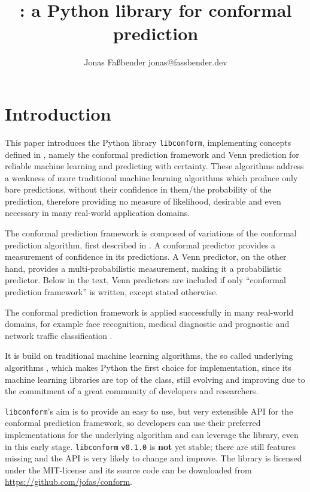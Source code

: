 \documentclass[twoside,11pt]{article}
\title{\libconform{} \version: a Python library for
       conformal prediction}
\author{\name Jonas Fa{\ss}bender
        \email jonas@fassbender.dev}
\def\version{\texttt{v0.1.0}}
\def\libconform{\texttt{libconform}}
\begin{document}
\maketitle




\section{Introduction}

This paper introduces the Python library \libconform,
implementing concepts defined in \citet{alrw}, namely the
conformal prediction framework and Venn prediction for
reliable machine learning and predicting with certainty.
These algorithms address a weakness of more traditional
machine learning algorithms which produce only bare
predictions, without their confidence in them/the
probability of the prediction, therefore providing no
measure of likelihood, desirable and even necessary in many
real-world application domains.

The conformal prediction framework is composed of
variations of the conformal prediction algorithm,
first described in
\citet{vovk_et_al_1999, saunders_et_al_1999}.
A conformal predictor provides a measurement of confidence
in its predictions.
A Venn predictor, on the other hand, provides a
multi-probabilistic measurement, making it a probabilistic
predictor.
Below in the text, Venn predictors are included if only
``conformal prediction framework'' is written, except
stated otherwise.

The conformal prediction framework is applied successfully
in many real-world domains, for example face recognition,
medical diagnostic and prognostic and network traffic
classification \citep[see][Part 3]{cprml}.

It is build on traditional machine learning algorithms, the
so called underlying algorithms
\citep[see][]{papadopoulos_et_al_2007}, which makes Python
the first choice for implementation, since its machine
learning libraries are top of the class, still evolving and
improving due to the commitment of a great community of
developers and researchers.

\libconform's aim is to provide an easy to use, but very
extensible API for the conformal prediction framework, so
developers can use their preferred implementations for the
underlying algorithm and can leverage the library, even in
this early stage.
\libconform{} \version{} is \textbf{not} yet stable; there
are still features missing and the API is very likely to
change and improve.
The library is licensed under the MIT-license and its
source code can be downloaded from
\url{https://github.com/jofas/conform}.
\end{document}
